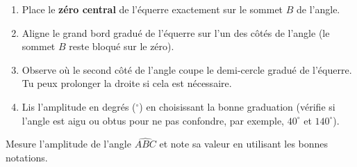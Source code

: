 \documentclass[../../syllabus_1.tex]{subfiles}
\begin{document}
\begin{tcolorbox}[title=Mesurer un angle]
    \begin{enumerate}
        \item Place le \textbf{zéro central} de l'équerre exactement sur le sommet $B$ de l'angle.
        \item Aligne le grand bord gradué de l'équerre sur l'un des côtés de l'angle (le sommet $B$ reste bloqué sur le zéro).
        \item Observe où le second côté de l'angle coupe le demi-cercle gradué de
              l'équerre. Tu peux prolonger la droite si cela est nécessaire.
        \item Lis l'amplitude en degrés ($^\circ$) en choisissant la bonne graduation (vérifie si l'angle est aigu ou obtus pour ne pas confondre, par exemple, $40^\circ$ et $140^\circ$).
    \end{enumerate}
\end{tcolorbox}


\begin{exercise}
    Mesure l'amplitude de l'angle $\widehat{ABC}$ et note sa valeur en utilisant
    les bonnes notations.
    \begin{center}
    \end{center}
\end{exercise}
\end{document}
